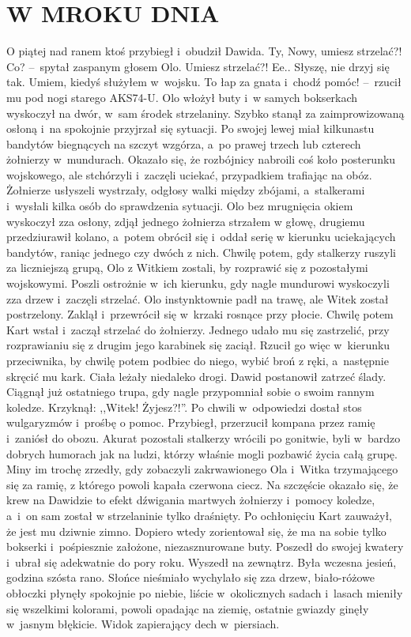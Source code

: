 \documentclass[../MAIN.tex]{subfiles}
\begin{document}
\section*{W MROKU DNIA}
\mm O piątej nad ranem ktoś przybiegł i~obudził Dawida.
\dd
\sd
\xx Ty, Nowy, umiesz strzelać?!
\xx Co? --~spytał zaspanym głosem Olo.
\xx Umiesz strzelać?!
\xx Ee.. Słyszę, nie drzyj się tak. Umiem, kiedyś służyłem w~wojsku.
\xx To łap za gnata i~chodź pomóc! --~rzucił mu pod nogi starego AKS74-U.
\qd
\hspace{33.5em}
Olo włożył buty i~w samych bokserkach wyskoczył na dwór, w~sam środek
strzelaniny. Szybko stanął za zaimprowizowaną osłoną i~na spokojnie przyjrzał
się sytuacji. Po swojej lewej miał kilkunastu bandytów biegnących na szczyt
wzgórza, a~po prawej trzech lub czterech żołnierzy w~mundurach. Okazało się, że
rozbójnicy nabroili coś koło posterunku wojskowego, ale stchórzyli i~zaczęli
uciekać, przypadkiem trafiając na obóz. Żołnierze usłyszeli wystrzały, odgłosy
walki między zbójami, a~stalkerami i~wysłali kilka osób do sprawdzenia sytuacji.
\pp
Olo bez mrugnięcia okiem wyskoczył zza osłony, zdjął jednego żołnierza strzałem
w głowę, drugiemu przedziurawił kolano, a~potem obrócił się i~oddał serię w
kierunku uciekających bandytów, raniąc jednego czy dwóch z nich. Chwilę potem,
gdy stalkerzy ruszyli za liczniejszą grupą, Olo z Witkiem zostali, by rozprawić
się z pozostałymi wojskowymi. Poszli ostrożnie w~ich kierunku, gdy nagle
mundurowi wyskoczyli zza drzew i~zaczęli strzelać. Olo instynktownie padł na
trawę, ale Witek został postrzelony. Zaklął i~przewrócił się w~krzaki rosnące
przy płocie. Chwilę potem Kart wstał i~zaczął strzelać do żołnierzy. Jednego
udało mu się zastrzelić, przy rozprawianiu się z drugim jego karabinek się
zaciął. Rzucił go więc w~kierunku przeciwnika, by chwilę potem podbiec do niego,
wybić broń z ręki, a~następnie skręcić mu kark.
\pp
Ciała leżały niedaleko drogi. Dawid postanowił zatrzeć ślady. Ciągnął już
ostatniego trupa, gdy nagle przypomniał sobie o swoim rannym koledze. Krzyknął:
,,Witek! Żyjesz?!''. Po chwili w~odpowiedzi dostał stos wulgaryzmów i~prośbę o
pomoc. Przybiegł, przerzucił kompana przez ramię i~zaniósł do obozu. Akurat
pozostali stalkerzy wrócili po gonitwie, byli w~bardzo dobrych humorach jak na
ludzi, którzy właśnie mogli pozbawić życia całą grupę.
Miny im trochę zrzedły,
gdy zobaczyli zakrwawionego Ola i~Witka trzymającego się za ramię, z którego
powoli kapała czerwona ciecz. Na szczęście okazało się, że krew na Dawidzie to
efekt dźwigania martwych żołnierzy i~pomocy koledze, a~i~on sam został w
strzelaninie tylko draśnięty.
\pp
Po ochłonięciu Kart zauważył, że jest mu dziwnie zimno. Dopiero wtedy
zorientował się, że ma na sobie tylko bokserki i~pośpiesznie założone,
niezasznurowane buty. Poszedł do swojej kwatery i~ubrał się adekwatnie do pory
roku. Wyszedł na zewnątrz. Była wczesna jesień, godzina szósta rano. Słońce
nieśmiało wychylało się zza drzew, biało-różowe obłoczki płynęły spokojnie
po niebie, liście w~okolicznych sadach i~lasach mieniły się wszelkimi kolorami,
powoli opadając na ziemię, ostatnie gwiazdy ginęły w~jasnym błękicie. Widok
zapierający dech w~piersiach.
\end{document}

